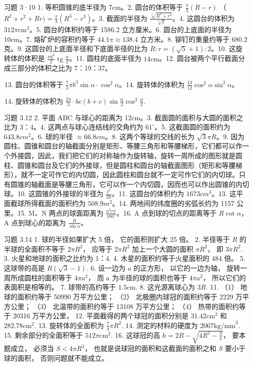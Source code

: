 习题 3·10 1. 等积圆锥的底半径为 7cm。2. 圆台的体积等于
\(\frac{\pi}{3}(R-r)\)
（\(R^2 + r^2 + Rr) = \frac{\pi}{3}(R^3 - r^3)\)。3. 截面的半径为
\(\frac{\sqrt[3]{R^3 + r^3}}{\sqrt[3]{2}}\)。4. 这圆台的体积为
\(312\pi \mathrm{cm}^3\)。5. 圆台的体积约等于 1586.2 立方厘米。6.
圆台的上底面的半径为 \(10\mathrm{cm}\)。7. 熔矿炉的容积约等于
\(44.1\pi \approx 138.4\) 立方米。8. 铆钉的重量约等于 680.2 克。9.
这圆台的上底面半径和下底面半径的比为 \(R: r = (\sqrt{5} + 1): 2\)。10.
这旋转体的体积是
\(\frac{\pi d^3}{2} \operatorname{tg} \frac{\alpha}{2}\)。11.
圆柱的底面半径为 \(14\mathrm{cm}\)。12.
圆台被两个平行截面分成三部分的体积之比为 7：19：37。

\begin{enumerate}
\setcounter{enumi}{12}
\item
  圆台的体积等于
  \(\frac{7}{3}\pi b^3\sin \alpha \cdot \cos^2\alpha\)。14.
  旋转体的体积为 \(\frac{13}{12}\cos^2\alpha\sin^2\alpha\)。
\item
  旋转体的体积为
  \(\frac{2\pi}{3} \cdot bc(b + c) \sin \frac{\alpha}{2} \cos^2 \frac{\alpha}{2}\).
\end{enumerate}

习题 3.12 2. 平面 ABC 与球心的距离为 12cm。3.
截面圆的面积与大圆的面积之比为 3：4。4. 这两点与球心连结线的交角约为
\(61^{\circ}\)。5. 这截面圆的面积约为 \(643.8cm^{2}\)。6. 球的半径
\(\approx 66.8cm\)。8. 这两个等球的交线的长为 \(\sqrt{3}\pi R\)。9.
因为圆柱、圆锥和圆台的轴截面分别是矩形、等腰三角形和等腰梯形，它们都可以作一个外接圆，因此，我们把它们的对称轴作为旋转轴，旋转一周所成的图形就是圆柱、圆锥和圆台及它们的外接球，但是圆柱和圆台的轴截面图形（矩形和等腰梯形），就不一定可作它的内切圆，因此圆柱和圆台就不一定可作它们的内切球。只有圆锥的轴截面是等腰三角形，它可以作一个内切圆，因而也可以作出圆锥的内切球。10.
这圆锥的外接球的半径为 \(\frac{l^{2}}{2h}\)。11. 这圆台的体积约为
\(1673 cm^{3}\)。13. 这平面截球所得截面的面积约为 \(508.9 m^{2}\)。14.
两地间的纬度圈的劣弧长约为 1157 公里。15. M、N 两点的球面距离为
\(\frac{n^{2} r \pi}{180^{\circ}}\)。16. A 点到球的切点的距离等于
\(R \cot \alpha\)，A 点到球心的距离为 \(\frac{R}{\sin \alpha}\)。

习题 3.14 1. 球的半径如果扩大 5 倍， 它的面积则扩大 25 倍。 2. 半径等于
\(R\) 的半球的全面积不等于 \(2\pi R^2\)， 应等于 \(2\pi R^2\)
加上一个大圆的面积 \(\pi R^2\)， 即 \(3\pi R^2\). 3.
火星和地球的面积之比约为 1：4. 4. 木星的面积约等于火星面积的 484 倍。 5.
这球带的高是 \(R(\sqrt{3} - 1)\). 6. 设一边为 \(a\) 的正方形，
以它的一边为轴， 旋转一周所成圆柱的面积等于 \(4\pi a^2\)， 而 \(a\)
为半径的球的面积也等于 \(4\pi a^2\)， 所以它们的表面积是相等的。 7.
球带的高约等于 \(1.5\mathrm{cm}\). 8. 这光源离球心为 \(3R\). 11. （1）
地球的面积约等于 50990 万平方公里； （2） 北极圈内球冠的面积约等于 2229
万平方公里； （3） 北温带的面积约等于 13108 万平方公里； （4）
热带的面积约等于 20316 万平方公里， 12. 平面截得的两个球冠的面积分别是
\(31.42\mathrm{cm}^2\) 和 \(282.78\mathrm{cm}^2\). 13. 旋转体的全面积为
\(\frac{7}{4}\pi R^2\). 14. 测定的材料的硬度为 \(2067\mathrm{kg/mm}^2\).
15. 剩余部分的全面积等于 \(512\pi \mathrm{cm}^2\). 16. 这球冠的高
\(h = 2R - \sqrt{4R^2 - \frac{S}{\pi}}\)， 要本题成立， 必须当
\(S < 4\pi R^2\)， 也就是说球冠的面积和这截面的面积之和 \(S\)
要小于球的面积， 否则问题就不能成立。

